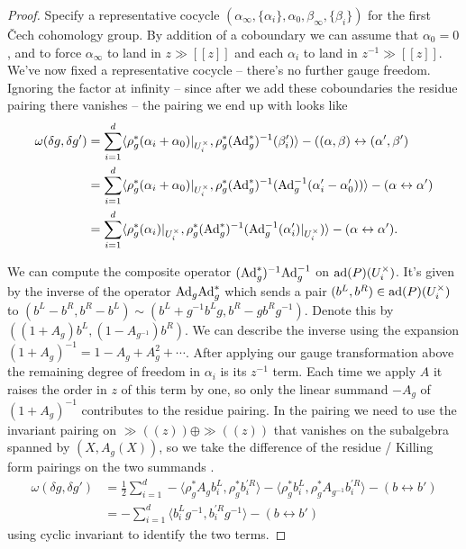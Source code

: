 \documentclass[10pt, oneside]{article}
\newcommand{\Ad}{\mr{Ad}}
\begin{document}
\begin{proof}
 Specify a representative cocycle $(\alpha_\infty, \{\alpha_i\}, \alpha_0, \beta_\infty, \{\beta_i\})$ for the first \v Cech cohomology group. By addition of a coboundary we can assume that $\alpha_0=0$, and to force $\alpha_\infty$ to land in $z\gg[[z]]$ and each $\alpha_i$ to land in $z^{-1}\gg[[z]]$.  We've now fixed a representative cocycle -- there's no further gauge freedom.  Ignoring the factor at infinity -- since after we add these coboundaries the residue pairing there vanishes -- the pairing we end up with looks like 
\begin{align*}
\omega(\delta g, \delta g') &= \sum_{i=1}^d \langle \rho_g^*(\alpha_i + \alpha_0)|_{U^\times_i},\rho_g^* (\Ad_g^*)^{-1}( \beta'_i) \rangle - ((\alpha,\beta) \leftrightarrow (\alpha',\beta')\\ 
&= \sum_{i=1}^d \langle \rho_g^*(\alpha_i + \alpha_0)|_{U^\times_i}, \rho_g^*(\Ad_g^*)^{-1}(\Ad_g^{-1}(\alpha_i' - \alpha'_0)) \rangle - (\alpha \leftrightarrow \alpha')\\
&= \sum_{i=1}^d \langle \rho_g^*(\alpha_i)|_{U^\times_i}, \rho_g^*(\Ad_g^*)^{-1}(\Ad_g^{-1}(\alpha_i')|_{U^\times_i}) \rangle - (\alpha \leftrightarrow \alpha').
\end{align*}

We can compute the composite operator $(\Ad_g^*)^{-1}\Ad_g^{-1}$ on $\mathrm{ad}(P)(U^\times_i)$.  It's given by the inverse of the operator $\Ad_g\Ad_g^*$ which sends a pair $(b^L, b^R) \in \mathrm{ad}(P)(U^\times_i)$ to $(b^L - b^R, b^R - b^L) \sim (b^L + g^{-1} b^L g, b^R - g b^R g^{-1})$.  Denote this by $((1+A_g)b^L,(1-A_{g^{-1}})b^R)$.  We can describe the inverse using the expansion $(1+A_g)^{-1} = 1 - A_g + A_g^2 + \cdots$.  After applying our gauge transformation above the remaining degree of freedom in $\alpha_i$ is its $z^{-1}$ term.  Each time we apply $A$ it raises the order in $z$ of this term by one, so only the linear summand $-A_g$ of $(1+A_g)^{-1}$ contributes to the residue pairing.  In the pairing we need to use the invariant pairing on $\gg((z)) \oplus \gg((z))$ that vanishes on the subalgebra spanned by $(X, A_g(X))$, so we take the difference of the residue / Killing form pairings on the two summands .
\begin{align*}
\omega(\delta g, \delta g') &= \frac 12 \sum_{i=1}^d  - \langle \rho_g^*A_g b^L_i, \rho_g^*b^{'R}_i \rangle - \langle \rho_g^*b^L_i, \rho_g^*A_{g^{-1}}b^{'R}_i \rangle- (b \leftrightarrow b') \\ 
&= - \sum_{i=1}^d \langle b^L_ig^{-1}, b^{'R}_i g^{-1} \rangle  - (b \leftrightarrow b')
\end{align*}
using cyclic invariant to identify the two terms. 
\end{proof}
\end{document}
